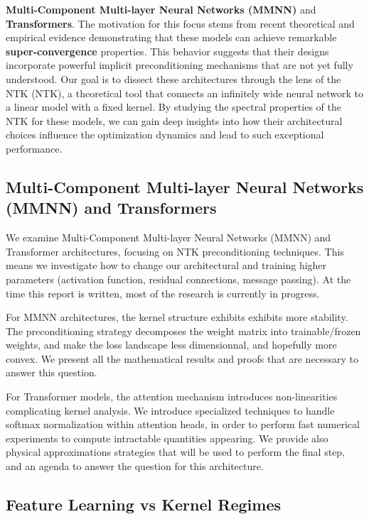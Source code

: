 \documentclass[11pt]{article}
\begin{document}
\textbf{Multi-Component Multi-layer Neural Networks (MMNN)} and \textbf{Transformers}. 
The motivation for this focus stems from recent theoretical and empirical evidence demonstrating that these models can achieve
 remarkable \textbf{super-convergence} properties. This behavior suggests that their designs incorporate powerful implicit 
 preconditioning mechanisms that are not yet fully understood. Our goal is to dissect these architectures through the lens 
 of the NTK (NTK), a theoretical tool that connects an infinitely wide neural network to a linear model
  with a fixed kernel. By studying the spectral properties of the NTK for these models, we can gain deep insights into how
   their architectural choices influence the optimization dynamics and lead to such exceptional performance.



\subsection{Multi-Component Multi-layer Neural Networks (MMNN) and Transformers}

We examine Multi-Component Multi-layer Neural Networks (MMNN) and Transformer architectures, focusing on NTK preconditioning techniques. This means we investigate how to change our architectural
and training higher parameters (activation function, residual connections, message passing). At the time this report is written, most of the research is currently in progress.

For MMNN architectures, the kernel structure exhibits exhibits more stability. The preconditioning strategy decomposes the weight matrix into trainable/frozen weights,
and make the loss landscape less dimensionnal, and hopefully more convex. We present all the mathematical results and proofs
that are necessary to answer this question.

For Transformer models, the attention mechanism introduces non-linearities complicating kernel analysis. 
We introduce specialized techniques to handle softmax normalization within attention heads, in order to perform fast numerical experiments to compute
intractable quantities appearing. We provide also physical approximations strategies that will be used to perform the final step, and an agenda
to answer the question for this architecture.

\subsection{Feature Learning vs Kernel Regimes}
\end{document}
